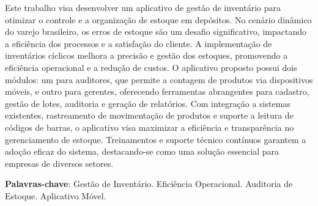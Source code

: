 Este trabalho visa desenvolver um aplicativo de gestão de inventário para otimizar o controle e a organização de estoque em depósitos. No cenário dinâmico do varejo brasileiro, os erros de estoque são um desafio significativo, impactando a eficiência dos processos e a satisfação do cliente. A implementação de inventários cíclicos melhora a precisão e gestão dos estoques, promovendo a eficiência operacional e a redução de custos. O aplicativo proposto possui dois módulos: um para auditores, que permite a contagem de produtos via dispositivos móveis, e outro para gerentes, oferecendo ferramentas abrangentes para cadastro, gestão de lotes, auditoria e geração de relatórios. Com integração a sistemas existentes, rastreamento de movimentação de produtos e suporte a leitura de códigos de barras, o aplicativo visa maximizar a eficiência e transparência no gerenciamento de estoque. Treinamentos e suporte técnico contínuos garantem a adoção eficaz do sistema, destacando-se como uma solução essencial para empresas de diversos setores.

\textbf{Palavras-chave}: Gestão de Inventário. Eficiência Operacional. Auditoria de Estoque. Aplicativo Móvel.
